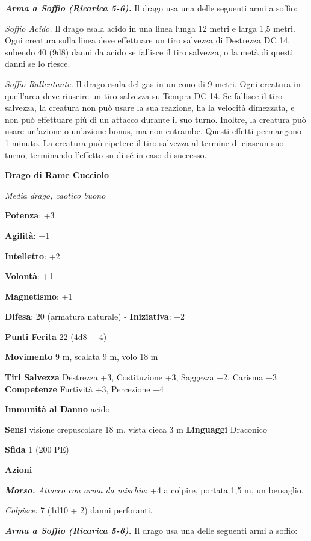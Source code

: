 \begin{multicols}{2}
\emph{\textbf{Arma a Soffio (Ricarica 5-6).}} Il drago usa una delle
seguenti armi a soffio:

\emph{Soffio Acido.} Il drago esala acido in una linea lunga 12 metri e
larga 1,5 metri. Ogni creatura sulla linea deve effettuare un tiro
salvezza di Destrezza DC 14, subendo 40 (9d8) danni da acido se fallisce
il tiro salvezza, o la metà di questi danni se lo riesce.

\emph{Soffio Rallentante.} Il drago esala del gas in un cono di 9 metri.
Ogni creatura in quell'area deve riuscire un tiro salvezza su Tempra DC 14. Se fallisce il tiro salvezza, la creatura non può
usare la sua reazione, ha la velocità dimezzata, e non può effettuare
più di un attacco durante il suo turno. Inoltre, la creatura può usare
un'azione o un'azione bonus, ma non entrambe. Questi effetti permangono
1 minuto. La creatura può ripetere il tiro salvezza al termine di
ciascun suo turno, terminando l'effetto su di sé in caso di successo.

\textbf{Drago di Rame Cucciolo}

\emph{Media drago, caotico buono}

\textbf{Potenza}: +3

\textbf{Agilità}: +1

\textbf{Intelletto}: +2

\textbf{Volontà}: +1

\textbf{Magnetismo}: +1

\textbf{Difesa}: 20 (armatura naturale) - \textbf{Iniziativa}: +2

\textbf{Punti Ferita} 22 (4d8 + 4)

\textbf{Movimento} 9 m, scalata 9 m, volo 18 m

\textbf{Tiri Salvezza} Destrezza +3, Costituzione +3, Saggezza +2,
Carisma +3 \textbf{Competenze} Furtività +3, Percezione +4

\textbf{Immunità al Danno} acido

\textbf{Sensi} visione crepuscolare 18 m, vista cieca 3 m
\textbf{Linguaggi} Draconico

\textbf{Sfida} 1 (200 PE)

\textbf{Azioni}

\emph{\textbf{Morso.} Attacco con arma da mischia}: +4 a colpire,
portata 1,5 m, un bersaglio.

\emph{Colpisce:} 7 (1d10 + 2) danni perforanti.

\emph{\textbf{Arma a Soffio (Ricarica 5-6).}} Il drago usa una delle
seguenti armi a soffio:


\end{multicols}
